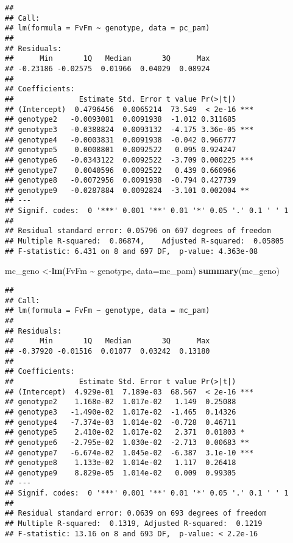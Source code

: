 \documentclass[
]{article}
\newenvironment{Shaded}{\begin{snugshade}}{\end{snugshade}}
\newcommand{\AttributeTok}[1]{\textcolor[rgb]{0.13,0.29,0.53}{#1}}
\newcommand{\FunctionTok}[1]{\textcolor[rgb]{0.13,0.29,0.53}{\textbf{#1}}}
\newcommand{\NormalTok}[1]{#1}
\newcommand{\OtherTok}[1]{\textcolor[rgb]{0.56,0.35,0.01}{#1}}
\newcommand{\SpecialCharTok}[1]{\textcolor[rgb]{0.81,0.36,0.00}{\textbf{#1}}}
\begin{document}
\begin{verbatim}
## 
## Call:
## lm(formula = FvFm ~ genotype, data = pc_pam)
## 
## Residuals:
##      Min       1Q   Median       3Q      Max 
## -0.23186 -0.02575  0.01966  0.04029  0.08924 
## 
## Coefficients:
##               Estimate Std. Error t value Pr(>|t|)    
## (Intercept)  0.4796456  0.0065214  73.549  < 2e-16 ***
## genotype2   -0.0093081  0.0091938  -1.012 0.311685    
## genotype3   -0.0388824  0.0093132  -4.175 3.36e-05 ***
## genotype4   -0.0003831  0.0091938  -0.042 0.966777    
## genotype5    0.0008801  0.0092522   0.095 0.924247    
## genotype6   -0.0343122  0.0092522  -3.709 0.000225 ***
## genotype7    0.0040596  0.0092522   0.439 0.660966    
## genotype8   -0.0072956  0.0091938  -0.794 0.427739    
## genotype9   -0.0287884  0.0092824  -3.101 0.002004 ** 
## ---
## Signif. codes:  0 '***' 0.001 '**' 0.01 '*' 0.05 '.' 0.1 ' ' 1
## 
## Residual standard error: 0.05796 on 697 degrees of freedom
## Multiple R-squared:  0.06874,    Adjusted R-squared:  0.05805 
## F-statistic: 6.431 on 8 and 697 DF,  p-value: 4.363e-08
\end{verbatim}

\begin{Shaded}
\begin{Highlighting}[]
\NormalTok{mc\_geno }\OtherTok{\textless{}{-}}\FunctionTok{lm}\NormalTok{(FvFm }\SpecialCharTok{\textasciitilde{}}\NormalTok{ genotype, }\AttributeTok{data=}\NormalTok{mc\_pam)}
\FunctionTok{summary}\NormalTok{(mc\_geno)}
\end{Highlighting}
\end{Shaded}

\begin{verbatim}
## 
## Call:
## lm(formula = FvFm ~ genotype, data = mc_pam)
## 
## Residuals:
##      Min       1Q   Median       3Q      Max 
## -0.37920 -0.01516  0.01077  0.03242  0.13180 
## 
## Coefficients:
##               Estimate Std. Error t value Pr(>|t|)    
## (Intercept)  4.929e-01  7.189e-03  68.567  < 2e-16 ***
## genotype2    1.168e-02  1.017e-02   1.149  0.25088    
## genotype3   -1.490e-02  1.017e-02  -1.465  0.14326    
## genotype4   -7.374e-03  1.014e-02  -0.728  0.46711    
## genotype5    2.410e-02  1.017e-02   2.371  0.01803 *  
## genotype6   -2.795e-02  1.030e-02  -2.713  0.00683 ** 
## genotype7   -6.674e-02  1.045e-02  -6.387  3.1e-10 ***
## genotype8    1.133e-02  1.014e-02   1.117  0.26418    
## genotype9    8.829e-05  1.014e-02   0.009  0.99305    
## ---
## Signif. codes:  0 '***' 0.001 '**' 0.01 '*' 0.05 '.' 0.1 ' ' 1
## 
## Residual standard error: 0.0639 on 693 degrees of freedom
## Multiple R-squared:  0.1319, Adjusted R-squared:  0.1219 
## F-statistic: 13.16 on 8 and 693 DF,  p-value: < 2.2e-16
\end{verbatim}
\end{document}
